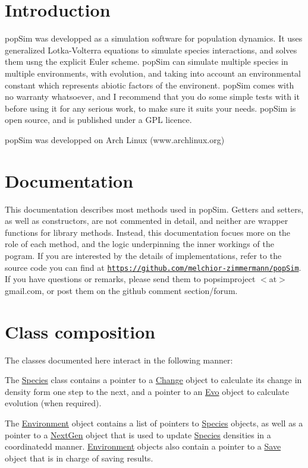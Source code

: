 \hypertarget{index_intro_sec}{}\section{Introduction}\label{index_intro_sec}
pop\+Sim was developped as a simulation software for population dynamics. It uses generalized Lotka-\/\+Volterra equations to simulate species interactions, and solves them usng the explicit Euler scheme. pop\+Sim can simulate multiple species in multiple environments, with evolution, and taking into account an environmental constant which represents abiotic factors of the environent. pop\+Sim comes with no warranty whatsoever, and I recommend that you do some simple tests with it before using it for any serious work, to make sure it suits your needs. pop\+Sim is open source, and is published under a G\+PL licence.

pop\+Sim was developped on Arch Linux (www.\+archlinux.\+org)\hypertarget{index_doc_sec}{}\section{Documentation}\label{index_doc_sec}
This documentation describes most methods used in pop\+Sim. Getters and setters, as well as constructors, are not commented in detail, and neither are wrapper functions for library methods. Instead, this documentation focues more on the role of each method, and the logic underpinning the inner workings of the pogram. If you are interested by the details of implementations, refer to the source code you can find at \href{https://github.com/melchior-zimmermann/popSim}{\tt https\+://github.\+com/melchior-\/zimmermann/pop\+Sim}. If you have questions or remarks, please send them to popsimproject $<$at$>$ gmail.\+com, or post them on the github comment section/forum.\hypertarget{index_doc_compo}{}\section{Class composition}\label{index_doc_compo}
The classes documented here interact in the following manner\+:

The \hyperlink{classSpecies}{Species} class contains a pointer to a \hyperlink{classChange}{Change} object to calculate its change in density form one step to the next, and a pointer to an \hyperlink{classEvo}{Evo} object to calculate evolution (when required).

The \hyperlink{classEnvironment}{Environment} object contains a list of pointers to \hyperlink{classSpecies}{Species} objects, as well as a pointer to a \hyperlink{classNextGen}{Next\+Gen} object that is used to update \hyperlink{classSpecies}{Species} densities in a coordinatedd manner. \hyperlink{classEnvironment}{Environment} objects also contain a pointer to a \hyperlink{classSave}{Save} object that is in charge of saving results.

